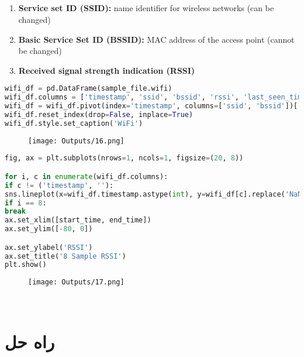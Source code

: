 \documentclass{article}
\begin{document}
\subsection*{}
\begin{flushleft}
	\begin{latin}
		\begin{enumerate}
			\item
			\textbf{Service set ID (SSID):} name identifier for wireless networks (can be changed)
			\item
			\textbf{Basic Service Set ID (BSSID):} MAC address of the access point (cannot be changed)
			\item 
			\textbf{Received signal strength indication (RSSI)}
		\end{enumerate}
	\end{latin}
\end{flushleft}
\begin{latin}
\begin{lstlisting}[language=Python]
wifi_df = pd.DataFrame(sample_file.wifi)
wifi_df.columns = ['timestamp', 'ssid', 'bssid', 'rssi', 'last_seen_timestamp']
wifi_df = wifi_df.pivot(index='timestamp', columns=['ssid', 'bssid'])['rssi']
wifi_df.reset_index(drop=False, inplace=True)
wifi_df.style.set_caption('WiFi')
\end{lstlisting}
\end{latin}
\begin{figure}[hbt!]
	\centering
	\texttt{[image: Outputs/16.png]}
\end{figure}
\begin{latin}
\begin{lstlisting}[language=Python]
fig, ax = plt.subplots(nrows=1, ncols=1, figsize=(20, 8))

for i, c in enumerate(wifi_df.columns):
if c != ('timestamp', ''):
sns.lineplot(x=wifi_df.timestamp.astype(int), y=wifi_df[c].replace('NaN', np.nan).astype(float), ax=ax, marker='o', label=c)
if i == 8:
break
ax.set_xlim([start_time, end_time])
ax.set_ylim([-80, 0])

ax.set_ylabel('RSSI')
ax.set_title('8 Sample RSSI')
plt.show()
\end{lstlisting}
\end{latin}
\begin{figure}[hbt!]
\centering
\texttt{[image: Outputs/17.png]}
\end{figure}
\ \\
\section{راه حل}
\end{document}

